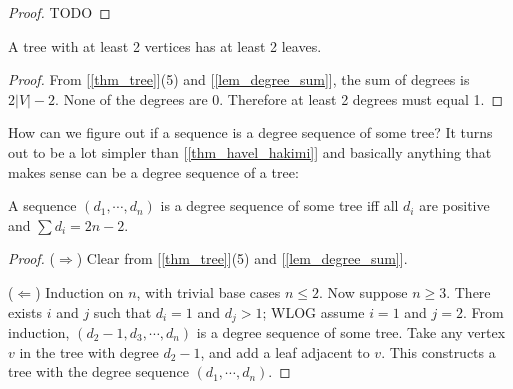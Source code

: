         \begin{proof}
            TODO
            
            
        \end{proof}
        
        \begin{thm} \label{thm_tree_leaf}
            A tree with at least 2 vertices has at least 2 leaves.
        \end{thm}
        
        \begin{proof}
            From [\ref{thm_tree}](5) and [\ref{lem_degree_sum}], the sum of degrees is $2|V|-2$. None of the degrees are 0. Therefore at least 2 degrees must equal 1.
        \end{proof}
        
        How can we figure out if a sequence is a degree sequence of some tree? It turns out to be a lot simpler than [\ref{thm_havel_hakimi}] and basically anything that makes sense can be a degree sequence of a tree:
        
        \begin{thm} \label{thm_tree_degree}
            A sequence $(d_1,\cdots,d_n)$ is a degree sequence of some tree iff all $d_i$ are positive and $\sum d_i = 2n-2$.
        \end{thm}
        
        \begin{proof}
            ($\Rightarrow$) Clear from [\ref{thm_tree}](5) and [\ref{lem_degree_sum}].
            
            ($\Leftarrow$) Induction on $n$, with trivial base cases $n \leq 2$. Now suppose $n \geq 3$. There exists $i$ and $j$ such that $d_i=1$ and $d_j>1$; WLOG assume $i=1$ and $j=2$. From induction, $(d_2-1,d_3,\cdots,d_n)$ is a degree sequence of some tree. Take any vertex $v$ in the tree with degree $d_2-1$, and add a leaf adjacent to $v$. This constructs a tree with the degree sequence $(d_1,\cdots,d_n)$.
        \end{proof}
    
